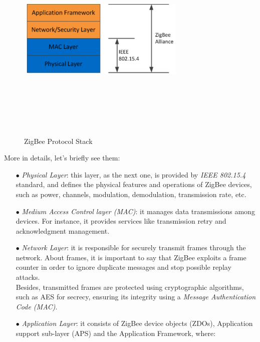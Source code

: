 \documentclass[12pt]{report}
\begin{document}
{{\begin{figure}[H]
\includegraphics[width=8cm,height=10cm,keepaspectratio]{zigbee_protocol_stack}
\centering
\caption{ZigBee Protocol Stack}
\end{figure}

More in details, let's briefly see them: 

\begin{itemize}
\setlength{\itemindent}{+4mm}
\item[$\bullet$] \emph{Physical Layer}: this layer, as the next one, is provided by \emph{IEEE 802.15.4} standard, and defines the physical features and operations of ZigBee devices, such as power, channels, modulation, demodulation, transmission rate, etc.
\item[$\bullet$] \emph{Medium Access Control layer (MAC)}: it manages data transmissions among devices. For instance, it provides services like transmission retry and acknowledgment management.
\item[$\bullet$] \emph{Network Layer}: it is responsible for securely transmit frames through the network. 
About frames, it is important to say that ZigBee exploits a frame counter in order to ignore duplicate messages and stop possible replay attacks.\\Besides, transmitted frames are protected using cryptographic algorithms, such as AES for secrecy, ensuring its integrity using a \emph{Message Authentication Code (MAC)}.

\item[$\bullet$] \emph{Application Layer}: it consists of ZigBee device objects (ZDOs), Application support sub-layer (APS) and the Application Framework, where: 


\end{itemize}}}
\end{document}
